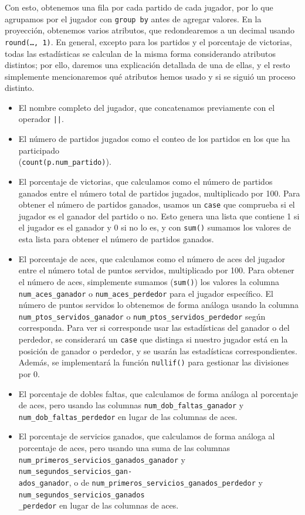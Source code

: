 \documentclass[11pt]{opticajnl}
\begin{document}
Con esto, obtenemos una fila por cada partido de cada jugador, por lo que agrupamos por el jugador con \texttt{group by} antes de agregar valores. En la proyección, obtenemos varios atributos, que redondearemos a un decimal usando \texttt{round(\dots, 1)}. En general, excepto para los partidos y el porcentaje de victorias, todas las estadísticas se calculan de la misma forma considerando atributos distintos; por ello, daremos una explicación detallada de una de ellas, y el resto simplemente mencionaremos qué atributos hemos usado y si se siguió un proceso distinto.
\begin{itemize}
\item El nombre completo del jugador, que concatenamos previamente con el operador \texttt{||}.
\item El número de partidos jugados como el conteo de los partidos en los que ha participado \\ (\texttt{count(p.num\_partido)}).
\item El porcentaje de victorias, que calculamos como el número de partidos ganados entre el número total de partidos jugados, multiplicado por 100. Para obtener el número de partidos ganados, usamos un \texttt{case} que comprueba si el jugador es el ganador del partido o no. Esto genera una lista que contiene 1 si el jugador es el ganador y 0 si no lo es, y con \texttt{sum()} sumamos los valores de esta lista para obtener el número de partidos ganados. 
\item El porcentaje de aces, que calculamos como el número de aces del jugador entre el número total de puntos servidos, multiplicado por 100. Para obtener el número de aces, simplemente sumamos (\texttt{sum()}) los valores la columna \texttt{num\_aces\_ganador} o \texttt{num\_aces\_perdedor} para el jugador específico. El número de puntos servidos lo obtenemos de forma análoga usando la columna \texttt{num\_ptos\_servidos\_ganador} o \texttt{num\_ptos\_servidos\_perdedor} según corresponda. Para ver si corresponde usar las estadísticas del ganador o del perdedor, se considerará un \texttt{case} que distinga si nuestro jugador está en la posición de ganador o perdedor, y se usarán las estadísticas correspondientes. Además, se implementará la función \texttt{nullif()} para gestionar las divisiones por 0. 
\item El porcentaje de dobles faltas, que calculamos de forma análoga al porcentaje de aces, pero usando las columnas \texttt{num\_dob\_faltas\_ganador} y \texttt{num\_dob\_faltas\_perdedor} en lugar de las columnas de aces. 
\item El porcentaje de servicios ganados, que calculamos de forma análoga al porcentaje de aces, pero usando una suma de las columnas \texttt{num\_primeros\_servicios\_ganados\_ganador} y \texttt{num\_segundos\_servicios\_gan-}\\\texttt{ados\_ganador}, o de \texttt{num\_primeros\_servicios\_ganados\_perdedor} y \texttt{num\_segundos\_servicios\_ganados}\\\texttt{\_perdedor} en lugar de las columnas de aces.

\end{itemize}
\end{document}
